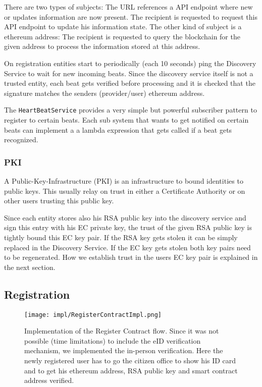 There are two types of subjects: The URL references a API endpoint where new or updates information are now present. The recipient is requested to request this API endpoint to update his information state. The other kind of subject is a ethereum address: The recipient is requested to query the blockchain for the given address to process the information stored at this address. 

On registration entities start to periodically (each 10 seconds) ping the Discovery Service to wait for new incoming beats. Since the discovery service itself is not a trusted entity, each beat gets verified before processing and it is checked that the signature matches the senders (provider/user) ethereum address.

The \lstinline{HeartBeatService} provides a very simple but powerful subscriber pattern to register to certain beats. Each sub system that wants to get notified on certain beats can implement a 
a lambda expression that gets called if a beat gets recognized. 

\subsubsection{PKI}
\label{sec:pki}

A Public-Key-Infrastructure (PKI) is an infrastructure to bound identities to public keys. This usually relay on trust in either a Certificate Authority or on other users trusting this public key. 

Since each entity stores also his RSA public key into the discovery service and sign this entry with his EC private key, the trust of the given RSA public key is tightly bound this EC key pair. If the RSA key gets stolen it can be simply replaced in the Discovery Service. If the EC key gets stolen both key pairs need to be regenerated. How we establish trust in the users EC key pair is explained in the next section.

\subsection{Registration}
\label{sec:registerContract}
\begin{figure}
\texttt{[image: impl/RegisterContractImpl.png]}
\centering
\caption{Implementation of the Register Contract flow. Since it was not possible (time limitations) to include the eID verification mechanism, we implemented the in-person verification. Here the newly registered user has to go the citizen office to show his ID card and to get his ethereum address, RSA public key and smart contract address verified.}
\label{fig:registerContractImpl}
\end{figure}

